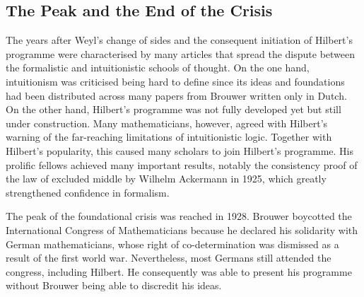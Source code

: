 \documentclass{article}
\begin{document}
\subsection{The Peak and the End of the Crisis}\label{ssec_end_crisis}
The years after Weyl's change of sides and the consequent initiation of Hilbert's programme were characterised by many articles that spread the dispute between the formalistic and intuitionistic schools of thought. On the one hand, intuitionism was criticised being hard to define since its ideas and foundations had been distributed across many papers from Brouwer written only in Dutch. On the other hand, Hilbert's programme was not fully developed yet but still under construction.
Many mathematicians, however, agreed with Hilbert's warning of the far-reaching limitations of intuitionistic logic. Together with Hilbert's popularity, this caused many scholars to join Hilbert's programme. His prolific fellows achieved many important results, notably the consistency proof of the law of excluded middle by Wilhelm Ackermann in 1925, which greatly strengthened confidence in formalism.

The peak of the foundational crisis was reached in 1928. Brouwer boycotted the International Congress of Mathematicians because he declared his solidarity with German mathematicians, whose right of co-determination was dismissed as a result of the first world war. Nevertheless, most Germans still attended the congress, including Hilbert. He consequently was able to present his programme without Brouwer being able to discredit his ideas.
\end{document}
